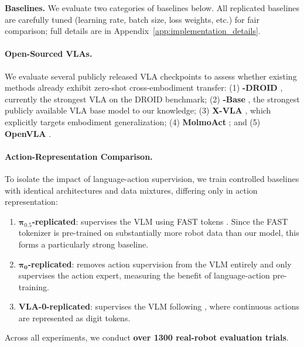 \noindent\textbf{Baselines.}
We evaluate two categories of baselines below. All replicated baselines are carefully tuned (learning rate, batch size, loss weights, etc.) for fair comparison; full details are in Appendix~\ref{app:implementation_details}.


\paragraph{Open-Sourced VLAs.}
We evaluate several publicly released VLA checkpoints to assess whether existing methods already exhibit zero-shot cross-embodiment transfer:
(1) \textbf{-DROID} \cite{intelligence2025pi05visionlanguageactionmodelopenworld}, currently the strongest VLA on the DROID benchmark;
(2) \textbf{-Base} \cite{intelligence2025pi05visionlanguageactionmodelopenworld}, the strongest publicly available VLA base model to our knowledge;
(3) \textbf{X-VLA} \cite{zheng2025xvlasoftpromptedtransformerscalable}, which explicitly targets embodiment generalization;
(4) \textbf{MolmoAct} \cite{lee2025molmoactactionreasoningmodels}; and
(5) \textbf{OpenVLA} \cite{kim2024openvlaopensourcevisionlanguageactionmodel}.


\paragraph{Action-Representation Comparison.}
To isolate the impact of language-action supervision, we train controlled baselines with identical architectures and data mixtures, differing only in action representation:

\begin{enumerate}
    \item \textbf{$\bm{\pi_{0.5}}$-replicated}: supervises the VLM using FAST tokens \cite{pertsch2025fastefficientactiontokenization}. Since the FAST tokenizer is pre-trained on substantially more robot data than our model, this forms a particularly strong baseline.
    \item \textbf{$\bm{\pi_{0}}$-replicated}: removes action supervision from the VLM entirely and only supervises the action expert, measuring the benefit of language-action pre-training.
    \item \textbf{VLA-0-replicated}: supervises the VLM following \citet{goyal2025vla0buildingstateoftheartvlas}, where continuous actions are represented as digit tokens.
\end{enumerate}
Across all experiments, we conduct \textbf{over 1300 real-robot evaluation trials}.

